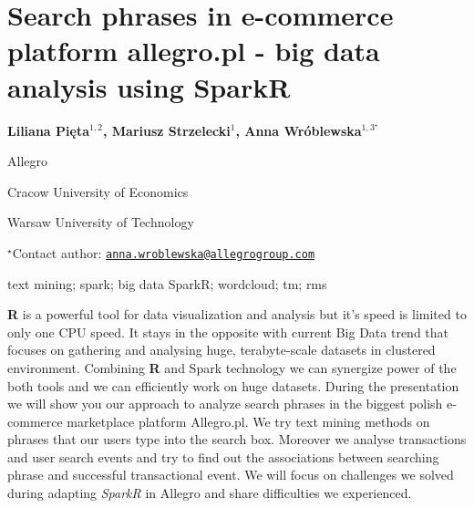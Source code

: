 \documentclass[\main/boa.tex]{subfiles}
\begin{document}
\section{Search phrases in e-commerce platform allegro.pl - big data analysis
using SparkR}

\begin{center}
  {\bf {} Liliana Pięta$^{1, 2}$,  Mariusz Strzelecki$^{1}$,  Anna Wróblewska$^{1, 3^\star}$}
\end{center}

\vskip 0.3cm

\begin{affiliations}
\begin{enumerate}
\begin{minipage}{0.915\textwidth}
\centering
\item Allegro \\[-2pt]
\item Cracow University of Economics \\[-2pt]
\item Warsaw University of Technology \\[-2pt]
\end{minipage}
\end{enumerate}
$^\star$Contact author: \href{mailto:anna.wroblewska@allegrogroup.com}{\nolinkurl{anna.wroblewska@allegrogroup.com}}\\
\end{affiliations}

\vskip 0.5cm

\begin{minipage}{0.915\textwidth}
\keywords text mining; spark; big data
\packages {} SparkR;  wordcloud;  tm;  rms
\end{minipage}

\vskip 0.8cm

\textbf{R} is a powerful tool for data visualization and analysis but
it's speed is limited to only one CPU speed. It stays in the opposite
with current Big Data trend that focuses on gathering and analysing
huge, terabyte-scale datasets in clustered environment. Combining
\textbf{R} and Spark technology we can synergize power of the both tools
and we can efficiently work on huge datasets. During the presentation we
will show you our approach to analyze search phrases in the biggest
polish e-commerce marketplace platform Allegro.pl. We try text mining
methods on phrases that our users type into the search box. Moreover we
analyse transactions and user search events and try to find out the
associations between searching phrase and successful transactional
event. We will focus on challenges we solved during adapting
\emph{SparkR} in Allegro and share difficulties we experienced.
\end{document}
